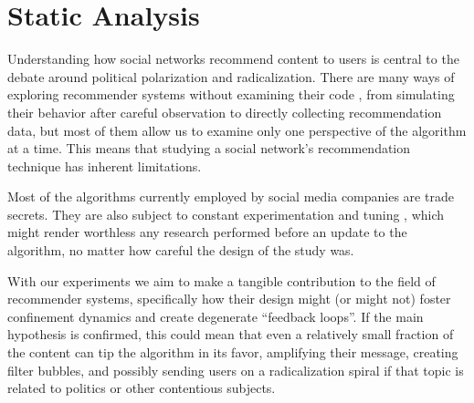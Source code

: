





\chapter{Static Analysis}
\label{cap:static}

Understanding how social networks recommend content to users is central to the
debate around political polarization and radicalization. There are many ways of
exploring recommender systems without examining their code \citep{}, from
simulating their behavior after careful observation to directly collecting
recommendation data, but most of them allow us to examine only one perspective
of the algorithm at a time. This means that studying a social network's
recommendation technique has inherent limitations.

Most of the algorithms currently employed by social media companies are trade
secrets. They are also subject to constant experimentation and tuning \citep{},
which might render worthless any research performed before an update to the
algorithm, no matter how careful the design of the study was.

With our experiments we aim to make a tangible contribution to the field of
recommender systems, specifically how their design might (or might not) foster
confinement dynamics and create degenerate ``feedback loops''. If the main
hypothesis is confirmed, this could mean that even a relatively small fraction
of the content can tip the algorithm in its favor, amplifying their message,
creating filter bubbles, and possibly sending users on a radicalization spiral
if that topic is related to politics or other contentious subjects.

